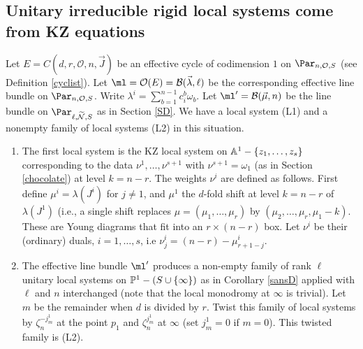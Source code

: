 \subsection{Unitary irreducible rigid local systems come from KZ equations}\label{KZstuff}
Let $E=C(d,r,\mathcal{O},n,\vec{J})$ be an effective cycle of codimension $1$ on $\Par_{n,\mathcal{O},S}$ (see Definition  \ref{cyclist}). Let $\ml=\mathcal{O}(E)=\mathcal{B}(\vec{\lambda},\ell)$ be the corresponding effective line bundle on $\Par_{n,\mathcal{O},S}$.  Write $\lambda^i=\sum_{b=1}^{n-1} c^b_i\omega_b$. Let
$\ml'=\mathcal{B}(\vec{\mu},n)$ be the  line bundle on $\Par_{\ell,\widetilde{\mathcal{N}},S}$ as in Section \ref{SD}. We have a local system (L1) and a nonempty family of local systems (L2) in this situation.
\begin{enumerate}

\item[(L1)] The first local system is the KZ local system on $\Bbb{A}^1-\{z_1,\dots,z_s\}$ corresponding to the data $\nu^1,\dots,\nu^{s+1}$ with $\nu^{s+1}=\omega_1$ (as in Section \ref{chocolate}) at level $k=n-r$.
The weights $\nu^i$ are defined as follows. First define $\mu^i=\lambda(J^i)$ for $j\neq1$, and $\mu^1$ the $d$-fold shift at level $k=n-r$ of $\lambda(J^1)$ (i.e., a single shift replaces $\mu=(\mu_1,\dots,\mu_r)$ by $(\mu_2,\dots,\mu_r,\mu_1-k)$. These are Young diagrams that fit into an $r\times (n-r)$ box. Let $\nu^i$ be their (ordinary) duals, $i=1,\dots,s$, i.e $\nu^i_j= (n-r)-\mu^i_{r+1-j}$.
\item[(L2)]The effective line bundle $\ml'$ produces a non-empty family of  rank $\ell$ unitary local systems on $\Bbb{P}^1-(S\cup\{\infty\})$ as in Corollary \ref{sansD} applied with $\ell$ and $n$ interchanged (note that the local monodromy at $\infty$ is trivial).  Let $m$ be the remainder when $d$ is divided by $r$. Twist this family of local systems by $\zeta_n^{-j^1_m}$ at the point $p_1$ and $\zeta_n^{j^1_{m}}$ at $\infty$ (set $j^1_m=0$ if $m=0$). This twisted family is (L2).
\end{enumerate}

